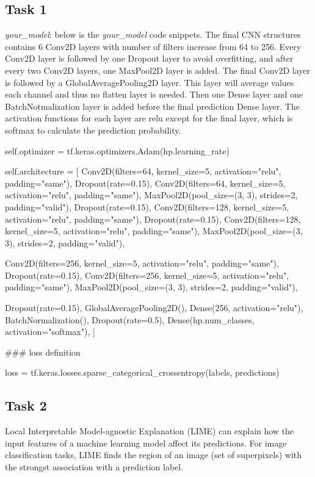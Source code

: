 \subsection*{Task 1}
\emph{your\_model}: below is the \textit{your\_model} code snippets. The final CNN structures contains 6 Conv2D layers with number of filters increase from 64 to 256. Every Conv2D layer is followed by one Dropout layer to avoid overfitting, and after every two Conv2D layers, one MaxPool2D layer is added. The final Conv2D layer is followed by a GlobalAveragePooling2D layer. This layer will average values each channel and thus no flatten layer is needed. Then one Dense layer and one BatchNotmalization layer is added before the final prediction Dense layer. The activation functions for each layer are relu except for the final layer, which is softmax to calculate the prediction probability.
          \begin{python}
self.optimizer = tf.keras.optimizers.Adam(hp.learning_rate)

self.architecture = [
    Conv2D(filters=64, kernel_size=5, activation="relu", padding="same"),
    Dropout(rate=0.15),
    Conv2D(filters=64, kernel_size=5, activation="relu", padding="same"),
    MaxPool2D(pool_size=(3, 3), strides=2, padding="valid"),
    Dropout(rate=0.15),
    Conv2D(filters=128, kernel_size=5, activation="relu", padding="same"),
    Dropout(rate=0.15),
    Conv2D(filters=128, kernel_size=5, activation="relu", padding="same"),
    MaxPool2D(pool_size=(3, 3), strides=2, padding="valid"),

    Conv2D(filters=256, kernel_size=5, activation="relu", padding="same"),
    Dropout(rate=0.15),
    Conv2D(filters=256, kernel_size=5, activation="relu", padding="same"),
    MaxPool2D(pool_size=(3, 3), strides=2, padding="valid"),

    Dropout(rate=0.15),
    GlobalAveragePooling2D(),
    Dense(256, activation="relu"),
    BatchNormalization(),
    Dropout(rate=0.5),
    Dense(hp.num_classes, activation="softmax"),
]

### loss definition

loss = tf.keras.losses.sparse_categorical_crossentropy(labels, predictions)
          \end{python}

\subsection*{Task 2}
Local Interpretable Model-agnostic Explanation (LIME) can explain how the input features of a machine learning model affect its predictions. For image classification tasks, LIME finds the region of an image (set of superpixels) with the strongst association with a prediction label.

